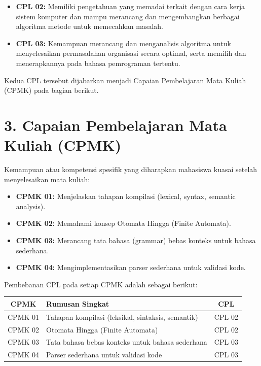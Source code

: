 \documentclass[12pt,a4paper]{article}
\begin{document}
\begin{itemize}[leftmargin=*]
  \item \textbf{CPL 02:} Memiliki pengetahuan yang memadai terkait dengan cara kerja sistem komputer dan mampu merancang dan mengembangkan berbagai algoritma metode untuk memecahkan masalah.

  \item \textbf{CPL 03:} Kemampuan merancang dan menganalisis algoritma untuk menyelesaikan permasalahan organisasi secara optimal, serta memilih dan menerapkannya pada bahasa pemrograman tertentu.
\end{itemize}

Kedua CPL tersebut dijabarkan menjadi Capaian Pembelajaran Mata Kuliah (CPMK) pada bagian berikut.

\vspace{0.5cm}

\section*{3. Capaian Pembelajaran Mata Kuliah (CPMK)}

Kemampuan atau kompetensi spesifik yang diharapkan mahasiswa kuasai setelah menyelesaikan mata kuliah:

\begin{itemize}[leftmargin=*]
  \item \textbf{CPMK 01:} Menjelaskan tahapan kompilasi (lexical, syntax, semantic analysis).

  \item \textbf{CPMK 02:} Memahami konsep Otomata Hingga (Finite Automata).

  \item \textbf{CPMK 03:} Merancang tata bahasa (grammar) bebas konteks untuk bahasa sederhana.

  \item \textbf{CPMK 04:} Mengimplementasikan parser sederhana untuk validasi kode.
\end{itemize}

Pembebanan CPL pada setiap CPMK adalah sebagai berikut:

\begin{center}
\begin{tabular}{|c|l|c|}
\hline
\textbf{CPMK} & \textbf{Rumusan Singkat} & \textbf{CPL} \\
\hline
CPMK 01 & Tahapan kompilasi (leksikal, sintaksis, semantik) & CPL 02 \\
\hline
CPMK 02 & Otomata Hingga (Finite Automata) & CPL 02 \\
\hline
CPMK 03 & Tata bahasa bebas konteks untuk bahasa sederhana & CPL 03 \\
\hline
CPMK 04 & Parser sederhana untuk validasi kode & CPL 03 \\
\hline
\end{tabular}
\end{center}
\end{document}
